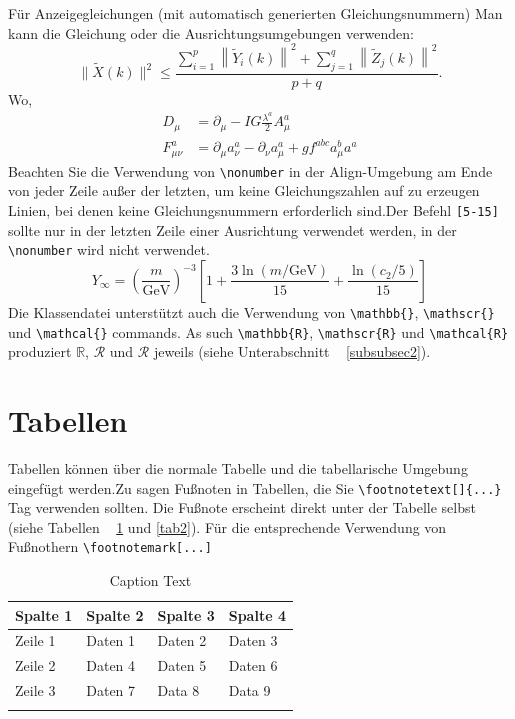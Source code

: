 \documentclass[pdflatex,sn-mathphys-num]{sn-jnl}%
\theoremstyle{thmstyleone}%
\theoremstyle{thmstyletwo}%
\theoremstyle{thmstylethree}%
\begin{document}
Für Anzeigegleichungen (mit automatisch generierten Gleichungsnummern)
Man kann die Gleichung oder die Ausrichtungsumgebungen verwenden:
\begin{equation}
\|\tilde{X}(k)\|^2 \leq\frac{\sum\limits_{i=1}^{p}\left\|\tilde{Y}_i(k)\right\|^2+\sum\limits_{j=1}^{q}\left\|\tilde{Z}_j(k)\right\|^2 }{p+q}.\label{eq1}
\end{equation}
Wo,
\begin{align}
D_ \mu & = \partial _ \mu-IG \frac{\lambda^a}{2} A^a_ \mu \nonumber \\
F^a _ {\mu \nu} & = \partial _ \mu a^a_ \nu-\partial _ \nu a^a_ \mu + g f^{abc} a^b_ \mu a^a
\end{align}
Beachten Sie die Verwendung von \verb+\nonumber+ in der Align-Umgebung am Ende
von jeder Zeile außer der letzten, um keine Gleichungszahlen auf zu erzeugen
Linien, bei denen keine Gleichungsnummern erforderlich sind.Der Befehl \verb+[5-15]+
sollte nur in der letzten Zeile einer Ausrichtung verwendet werden, in der
\verb+\nonumber+ wird nicht verwendet.
\begin{equation}
Y_\infty = \left( \frac{m}{\textrm{GeV}} \right)^{-3}
    \left[ 1 + \frac{3 \ln(m/\textrm{GeV})}{15}
    + \frac{\ln(c_2/5)}{15} \right]
\end{equation}
Die Klassendatei unterstützt auch die Verwendung von \verb+\mathbb{}+, \verb+\mathscr{}+ und
\verb+\mathcal{}+ commands. As such \verb+\mathbb{R}+, \verb+\mathscr{R}+
und \verb+\mathcal{R}+ produziert $\mathbb{R}$, $\mathscr{R}$ und $\mathcal{R}$
jeweils (siehe Unterabschnitt ~ \ref{subsubsec2}).

\section{Tabellen} \label{sec5}

Tabellen können über die normale Tabelle und die tabellarische Umgebung eingefügt werden.Zu sagen
Fußnoten in Tabellen, die Sie \verb+\footnotetext[]{...}+ Tag verwenden sollten.
Die Fußnote erscheint direkt unter der Tabelle selbst (siehe Tabellen ~ \ref{tab1} und \ref{tab2}).
Für die entsprechende Verwendung von Fußnothern \verb+\footnotemark[...]+

\begin{table}[h]
\caption{Caption Text} \label{tab1} %
\begin{tabular}{@{}llll@{}}
\toprule
Spalte 1 & Spalte 2 & Spalte 3 & Spalte 4 \\
\midrule
Zeile 1 & Daten 1 & Daten 2 & Daten 3 \\
Zeile 2 & Daten 4 & Daten 5 \footnotemark[1] & Daten 6 \\
Zeile 3 & Daten 7 & Data 8 & Data 9 \footnotemark[2] \\
\botrule
\end{tabular}
   \end{table}
\end{document}
